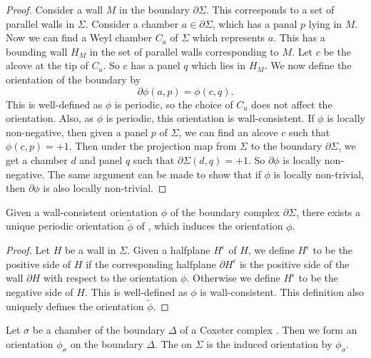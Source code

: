 \documentclass[11pt]{article}
\begin{document}
\begin{proof}
    Consider a wall $M$ in the boundary $\partial\Sigma$. This corresponds to a set of parallel walls in $\Sigma$. Consider a chamber $a\in \partial\Sigma$, which has a panal $p$ lying in $M$. Now we can find a Weyl chamber $C_a$ of $\Sigma$ which represents $a$. This has a bounding wall $H_M$ in the set of parallel walls corresponding to $M$. Let $c$ be the alcove at the tip of $C_a$. So $c$ has a panel $q$ which lies in $H_M$. We now define the orientation of the boundary by 
    \[\partial \phi (a,p)= \phi (c,q).\]
    This is well-defined as $\phi$ is periodic, so the choice of $C_a$ does not affect the orientation. Also, as $\phi$ is periodic, this orientation is wall-consistent. 
    If $\phi$ is locally non-negative, then given a panel $p$ of $\Sigma$, we can find an alcove $c$ such that $\phi(c,p)=+1$. Then under the projection map from $\Sigma$ to the boundary $\partial\Sigma$, we get a chamber $d$ and panel $q$ such that $\partial\Sigma(d,q)=+1$. So $\partial\phi$ is locally non-negative. The same argument can be made to show that if $\phi$ is locally non-trivial, then $\partial\phi$ is also locally non-trivial. 
\end{proof}


\begin{lemma}
    Given a wall-consistent orientation $\phi$ of the boundary complex $\partial\Sigma$, there exists a unique periodic orientation $\tilde{\phi}$ of \sg, which induces the orientation $\phi$. 
\end{lemma}

\begin{proof}
    Let $H$ be a wall in $\Sigma$. Given a halfplane $H^\epsilon$ of $H$, we define $H^\epsilon$ to be the positive side of $H$ if the corresponding halfplane $\partial H^\epsilon$ is the positive side of the wall $\partial H$ with respect to the orientation $\phi$. Otherwise we define $H^\epsilon$ to be the negative side of $H$. This is well-defined as $\phi$ is wall-consistent. This definition also uniquely defines the orientation $\tilde{\phi}$. 
\end{proof}

\begin{definition}
    Let $\sigma$ be a chamber of the boundary $\Delta$ of a Coxeter complex \sg. Then we form an orientation $\phi_{\sigma}$ on the boundary $\Delta$. The  on $\Sigma$ is the induced orientation by $\phi_{\sigma}$. 
\end{definition}
\end{document}
